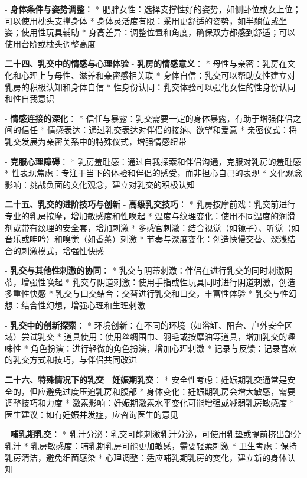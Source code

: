 \begin{enumerate}
  - \textbf{身体条件与姿势调整}：
    * 肥胖女性：选择支撑性好的姿势，如侧卧位或女上位；可以使用枕头支撑身体
    * 身体灵活度有限：采用更舒适的姿势，如半躺位或坐姿；使用性玩具辅助
    * 身高差异：调整位置和角度，确保双方都感到舒适；可以使用台阶或枕头调整高度

  \textbf{二十四、乳交中的情感与心理体验}
  - \textbf{乳房的情感意义}：
    * 母性与亲密：乳房在文化和心理上与母性、滋养和亲密感相关联
    * 身体自信：乳交可以帮助女性建立对乳房的积极认知和身体自信
    * 性身份认同：乳交体验可以强化女性的性身份认同和性自我意识

  - \textbf{情感连接的深化}：
    * 信任与暴露：乳交需要一定的身体暴露，有助于增强伴侣之间的信任
    * 情感表达：通过乳交表达对伴侣的接纳、欲望和爱意
    * 亲密仪式：将乳交发展为亲密关系中的特殊仪式，增强情感纽带

  - \textbf{克服心理障碍}：
    * 乳房羞耻感：通过自我探索和伴侣沟通，克服对乳房的羞耻感
    * 性表现焦虑：专注于当下的体验和伴侣的感受，而非担心自己的表现
    * 文化观念影响：挑战负面的文化观念，建立对乳交的积极认知

  \textbf{二十五、乳交的进阶技巧与创新}
  - \textbf{高级乳交技巧}：
    * 乳房按摩前戏：乳交前进行专业的乳房按摩，增加敏感度和性唤起
    * 温度与纹理变化：使用不同温度的润滑剂或带有纹理的安全套，增加刺激
    * 多感官刺激：结合视觉（如镜子）、听觉（如音乐或呻吟）和嗅觉（如香薰）刺激
    * 节奏与深度变化：创造快慢交替、深浅结合的刺激模式，增强性快感

  - \textbf{乳交与其他性刺激的协同}：
    * 乳交与阴蒂刺激：伴侣在进行乳交的同时刺激阴蒂，增强性唤起
    * 乳交与阴道刺激：使用手指或性玩具同时进行阴道刺激，创造多重性快感
    * 乳交与口交结合：交替进行乳交和口交，丰富性体验
    * 乳交与性幻想：结合性幻想，增强心理和生理刺激

  - \textbf{乳交中的创新探索}：
    * 环境创新：在不同的环境（如浴缸、阳台、户外安全区域）尝试乳交
    * 道具使用：使用丝绸围巾、羽毛或按摩油等道具，增加乳交的趣味性
    * 角色扮演：进行轻微的角色扮演，增加心理刺激
    * 记录与反馈：记录喜欢的乳交方式和技巧，与伴侣共同改进

  \textbf{二十六、特殊情况下的乳交}
  - \textbf{妊娠期乳交}：
    * 安全性考虑：妊娠期乳交通常是安全的，但应避免过度压迫乳房和腹部
    * 身体变化：妊娠期乳房会增大敏感，需要调整技巧和力度
    * 激素影响：妊娠期激素水平变化可能增强或减弱乳房敏感度
    * 医生建议：如有妊娠并发症，应咨询医生的意见

  - \textbf{哺乳期乳交}：
    * 乳汁分泌：乳交可能刺激乳汁分泌，可使用乳垫或提前挤出部分乳汁
    * 乳房敏感度：哺乳期乳房可能更加敏感，需要轻柔刺激
    * 卫生考虑：保持乳房清洁，避免细菌感染
    * 心理调整：适应哺乳期乳房的变化，建立新的身体认知


\end{enumerate}

